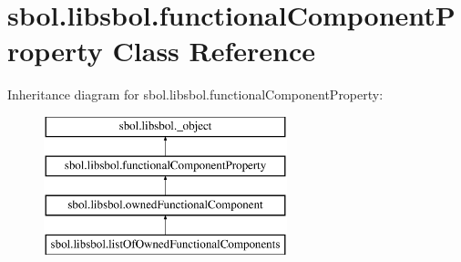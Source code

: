 \hypertarget{classsbol_1_1libsbol_1_1functional_component_property}{}\section{sbol.\+libsbol.\+functional\+Component\+Property Class Reference}
\label{classsbol_1_1libsbol_1_1functional_component_property}
Inheritance diagram for sbol.\+libsbol.\+functional\+Component\+Property\+:\begin{figure}[H]
\begin{center}
\leavevmode
\includegraphics[height=4.000000cm]{classsbol_1_1libsbol_1_1functional_component_property}
\end{center}
\end{figure}
